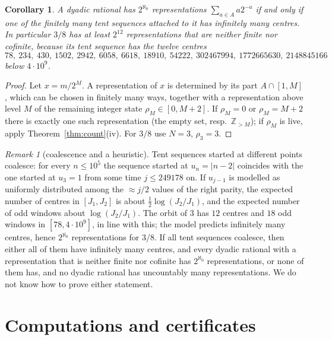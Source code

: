 \documentclass[11pt]{amsart}
\newtheorem{corollary}[theorem]{Corollary}
\theoremstyle{definition}
\theoremstyle{remark}
\newtheorem{remark}[theorem]{Remark}
\newcommand{\Z}{\mathbb{Z}}
\begin{document}
\begin{corollary}\label{cor:iii}
A dyadic rational has $2^{\aleph_0}$ representations $\sum_{a\in A}a2^{-a}$ if and only if one of the finitely many tent sequences attached to it has infinitely many centres. In particular $3/8$ has at least $2^{12}$ representations that are neither finite nor cofinite, because its tent sequence has the twelve centres
\[
78,\ 234,\ 430,\ 1502,\ 2942,\ 6058,\ 6618,\ 18910,\ 54222,\ 302467994,\ 1772665630,\ 2148845166
\]
below $4\cdot10^9$.
\end{corollary}

\begin{proof}
Let $x=m/2^M$. A representation of $x$ is determined by its part $A\cap[1,M]$, which can be chosen in finitely many ways, together with a representation above level $M$ of the remaining integer state $\rho_M\in[0,M+2]$. If $\rho_M=0$ or $\rho_M=M+2$ there is exactly one such representation (the empty set, resp.\ $\Z_{>M}$); if $\rho_M$ is live, apply Theorem~\ref{thm:count}(iv). For $3/8$ use $N=3$, $\rho_3=3$.
\end{proof}

\begin{remark}[coalescence and a heuristic]
Tent sequences started at different points coalesce: for every $n\le10^5$ the sequence started at $u_n=|n-2|$ coincides with the one started at $u_3=1$ from some time $j\le249178$ on. If $u_{j-1}$ is modelled as uniformly distributed among the $\approx j/2$ values of the right parity, the expected number of centres in $[J_1,J_2]$ is about $\frac12\log(J_2/J_1)$, and the expected number of odd windows about $\log(J_2/J_1)$. The orbit of $3$ has $12$ centres and $18$ odd windows in $[78,4\cdot10^9]$, in line with this; the model predicts infinitely many centres, hence $2^{\aleph_0}$ representations for $3/8$. If all tent sequences coalesce, then either all of them have infinitely many centres, and every dyadic rational with a representation that is neither finite nor cofinite has $2^{\aleph_0}$ representations, or none of them has, and no dyadic rational has uncountably many representations. We do not know how to prove either statement.
\end{remark}

\section{Computations and certificates}\label{sec:cert}
\end{document}
